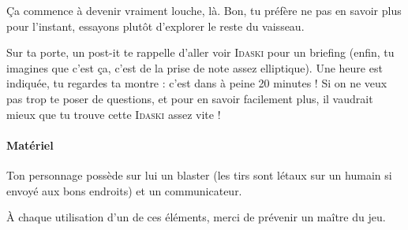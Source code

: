 \documentclass{article}
\begin{document}
{{Ça commence à devenir vraiment louche, là.
Bon, tu préfère ne pas en savoir plus pour l’instant, essayons plutôt d’explorer le reste du vaisseau.

Sur ta porte, un post-it te rappelle d’aller voir \textsc{Idaski} pour un briefing (enfin, tu imagines que c’est ça, c’est de la prise de note assez elliptique).
Une heure est indiquée, tu regardes ta montre : c’est dans à peine 20 minutes !
Si on ne veux pas trop te poser de questions, et pour en savoir facilement plus, il vaudrait mieux que tu trouve cette \textsc{Idaski} assez vite !
}

\paragraph{Matériel}
{
Ton personnage possède sur lui un blaster (les tirs sont létaux sur un humain si envoyé aux bons endroits) et un communicateur.

À chaque utilisation d’un de ces éléments, merci de prévenir un maître du jeu.
}
}
\end{document}
